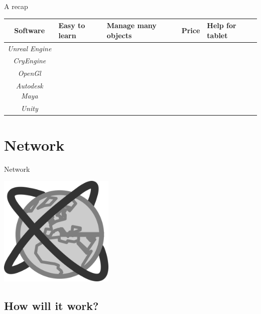 \documentclass[a4paper,10pt]{beamer}
\begin{document}
			\begin{frame}{A recap}
				\begin{tabularx}{300pt}{|c|X|X|c|X|}
					\hline
					\textbf{Software} & \textbf{Easy to learn} & \textbf{Manage many objects} & \textbf{Price} & \textbf{Help for tablet}\\
					\hline
					\textit{Unreal Engine} & \color{green}{\checkmark} & \color{green}{\checkmark} & \color{orange}{19\euro/month + 5 \%} & \color{red}{$\times$}\\
					\hline
					\textit{CryEngine} & \color{green}{\checkmark} & \color{green}{\checkmark} & \color{orange}{9.99\euro/month} & \color{orange}{$\sim$}\\
					\hline
					\textit{OpenGl} & \color{red}{$\times$} & \color{orange}{$\sim$} & \color{green}{0\euro} & \color{red}{$\times$}\\
					\hline
					\textit{Autodesk Maya} & \color{red}{$\times$} & \color{green}{\checkmark} & \color{red}{\$185.00/month} & \color{orange}{$\sim$}\\
					\hline
					\textit{Unity} & \color{green}{\checkmark} & \color{green}{\checkmark} & \color{green}{0\euro : free licence} & \color{green}{\checkmark} \\
					\hline
				\end{tabularx}
			\end{frame}
			
	\section{Network}
			
			\begin{frame}{Network}
				\centerline{\includegraphics[height=150pt]{images/network/network.png}}
			\end{frame}
			
		\subsection{How will it work?}
		
\end{document}
